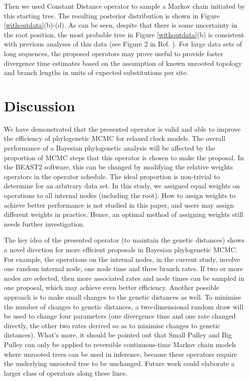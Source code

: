 \documentclass{bmcart}
\begin{document}
Then we used Constant Distance operator to sample a Markov chain initiated by this starting tree. The resulting posterior distribution is shown in Figure \ref{withoutdata}(b)-(d). As can be seen, despite that there is some uncertainty in the root position, the most probable tree in Figure \ref{withoutdata}(b) is consistent with previous analyses of this data (see Figure 2 in Ref. \cite{cooper2001complete}). For large data sets of long sequences, the proposed operators may prove useful to provide faster divergence time estimates based on the assumption of known unrooted topology and branch lengths in units of expected substitutions per site.

\section*{Discussion}
We have demonstrated that the presented operator is valid and able to improve the efficiency of phylogenetic MCMC for relaxed clock models. The overall performance of a Bayesian phylogenetic analysis will be affected by the proportion of MCMC steps that this operator is chosen to make the proposal. In the BEAST2 software, this can be changed by modifying the relative weights operators in the operator schedule. The ideal proportion is non-trivial to determine for an arbitrary data set. In this study, we assigned equal weights on operations to all internal nodes (including the root). How to assign weights to achieve better performance is not studied in this paper, and users may assign different weights in practice. Hence, an optimal method of assigning weights still needs further investigation. 

The key idea of the presented operator (to maintain the genetic distances) shows a novel direction for more efficient proposals in Bayesian phylogenetic MCMC. For example, the operations on the internal nodes, in the current study, involve one random internal node, one node time and three branch rates. If two or more nodes are selected, then more associated rates and node times can be sampled in one proposal, which may achieve even better efficiency. Another possible approach is to make small changes to the genetic distances as well. To minimise the number of changes to genetic distances, a two-dimensional random draw will be used to change four parameters (one divergence time and one rate changed directly, the other two rates derived so as to minimise changes to genetic distances). What's more, it should be pointed out that Small Pulley and Big Pulley can only be applied to reversible continuous-time Markov chain models where unrooted trees can be used in inference, because these operators require the underlying unrooted tree to be unchanged. Future work could elaborate a larger class of operators along these lines.
\end{document}
